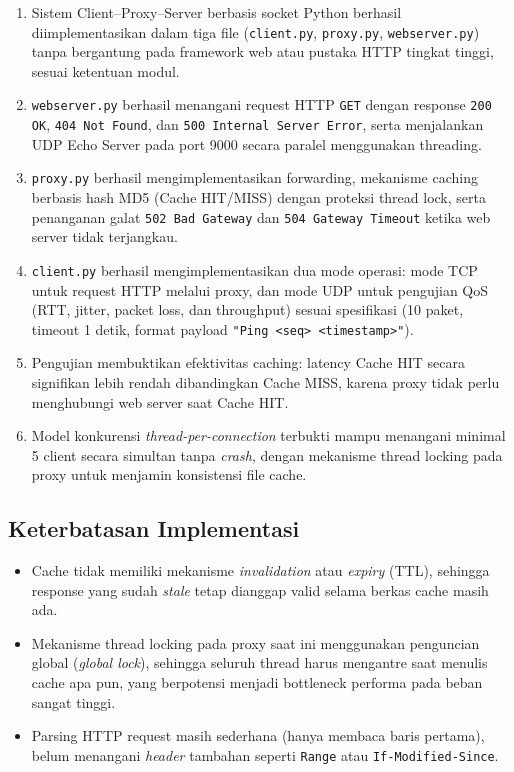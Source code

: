 \documentclass[11pt,a4paper]{article}
\begin{document}
\begin{enumerate}[noitemsep]
    \item Sistem Client--Proxy--Server berbasis socket Python berhasil diimplementasikan dalam tiga file (\texttt{client.py}, \texttt{proxy.py}, \texttt{webserver.py}) tanpa bergantung pada framework web atau pustaka HTTP tingkat tinggi, sesuai ketentuan modul.
    \item \texttt{webserver.py} berhasil menangani request HTTP \texttt{GET} dengan response \texttt{200 OK}, \texttt{404 Not Found}, dan \texttt{500 Internal Server Error}, serta menjalankan UDP Echo Server pada port 9000 secara paralel menggunakan threading.
    \item \texttt{proxy.py} berhasil mengimplementasikan forwarding, mekanisme caching berbasis hash MD5 (Cache HIT/MISS) dengan proteksi thread lock, serta penanganan galat \texttt{502 Bad Gateway} dan \texttt{504 Gateway Timeout} ketika web server tidak terjangkau.
    \item \texttt{client.py} berhasil mengimplementasikan dua mode operasi: mode TCP untuk request HTTP melalui proxy, dan mode UDP untuk pengujian QoS (RTT, jitter, packet loss, dan throughput) sesuai spesifikasi (10 paket, timeout 1 detik, format payload \texttt{"Ping <seq> <timestamp>"}).
    \item Pengujian membuktikan efektivitas caching: latency Cache HIT secara signifikan lebih rendah dibandingkan Cache MISS, karena proxy tidak perlu menghubungi web server saat Cache HIT.
    \item Model konkurensi \textit{thread-per-connection} terbukti mampu menangani minimal 5 client secara simultan tanpa \textit{crash}, dengan mekanisme thread locking pada proxy untuk menjamin konsistensi file cache.
\end{enumerate}

\subsection{Keterbatasan Implementasi}

\begin{itemize}[noitemsep]
    \item Cache tidak memiliki mekanisme \textit{invalidation} atau \textit{expiry} (TTL), sehingga response yang sudah \textit{stale} tetap dianggap valid selama berkas cache masih ada.
    \item Mekanisme thread locking pada proxy saat ini menggunakan penguncian global (\textit{global lock}), sehingga seluruh thread harus mengantre saat menulis cache apa pun, yang berpotensi menjadi bottleneck performa pada beban sangat tinggi.
    \item Parsing HTTP request masih sederhana (hanya membaca baris pertama), belum menangani \textit{header} tambahan seperti \texttt{Range} atau \texttt{If-Modified-Since}.
\end{itemize}
\end{document}
